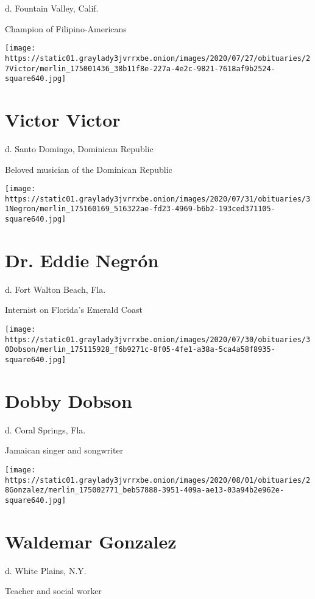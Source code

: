 d. Fountain Valley, Calif.

Champion of Filipino-Americans

\texttt{[image: https://static01.graylady3jvrrxbe.onion/images/2020/07/27/obituaries/27Victor/merlin\_175001436\_38b11f8e-227a-4e2c-9821-7618af9b2524-square640.jpg]}

\hypertarget{victor-victor}{%
\section{Victor Victor}\label{victor-victor}}

d. Santo Domingo, Dominican Republic

Beloved musician of the Dominican Republic

\texttt{[image: https://static01.graylady3jvrrxbe.onion/images/2020/07/31/obituaries/31Negron/merlin\_175160169\_516322ae-fd23-4969-b6b2-193ced371105-square640.jpg]}

\hypertarget{dr-eddie-negruxf3n}{%
\section{Dr. Eddie Negrón}\label{dr-eddie-negruxf3n}}

d. Fort Walton Beach, Fla.

Internist on Florida's Emerald Coast

\texttt{[image: https://static01.graylady3jvrrxbe.onion/images/2020/07/30/obituaries/30Dobson/merlin\_175115928\_f6b9271c-8f05-4fe1-a38a-5ca4a58f8935-square640.jpg]}

\hypertarget{dobby-dobson}{%
\section{Dobby Dobson}\label{dobby-dobson}}

d. Coral Springs, Fla.

Jamaican singer and songwriter

\texttt{[image: https://static01.graylady3jvrrxbe.onion/images/2020/08/01/obituaries/28Gonzalez/merlin\_175002771\_beb57888-3951-409a-ae13-03a94b2e962e-square640.jpg]}

\hypertarget{waldemar-gonzalez}{%
\section{Waldemar Gonzalez}\label{waldemar-gonzalez}}

d. White Plains, N.Y.

Teacher and social worker

